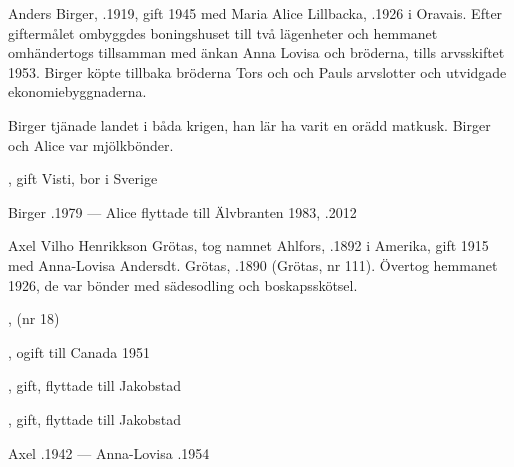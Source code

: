 Anders Birger, .1919, gift 1945 med Maria Alice Lillbacka, .1926 i Oravais. Efter giftermålet ombyggdes boningshuset till två lägenheter och hemmanet omhändertogs tillsamman med änkan Anna Lovisa och bröderna, tills arvsskiftet 1953. Birger köpte tillbaka bröderna Tors och och Pauls arvslotter och utvidgade ekonomiebyggnaderna.

Birger tjänade landet i båda krigen, han lär ha varit en orädd matkusk. Birger och Alice var mjölkbönder.
\begin{jhchildren}
  \item {}, gift Visti, bor i Sverige
  \item {}
\end{jhchildren}

Birger .1979  ---  Alice flyttade till Älvbranten 1983, .2012


Axel Vilho Henrikkson Grötas, tog namnet Ahlfors, .1892 i Amerika, gift 1915 med Anna-Lovisa Andersdt. Grötas, .1890 (Grötas, nr 111). Övertog hemmanet 1926, de var bönder med sädesodling och boskapsskötsel.
\begin{jhchildren}
  \item {}
  \item {}, (nr 18)
  \item {}, ogift till Canada 1951
  \item {}, gift, flyttade till Jakobstad
  \item {}, gift, flyttade till Jakobstad
\end{jhchildren}

Axel .1942  ---  Anna-Lovisa .1954


